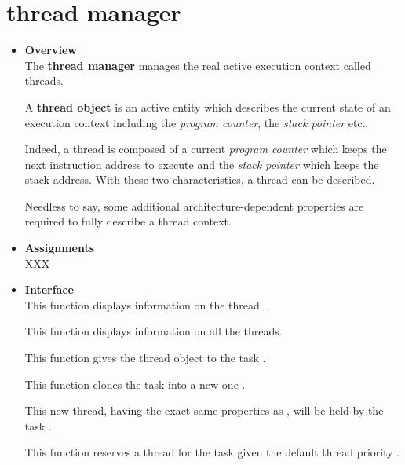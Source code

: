 \section{\textbf{thread} manager}
\begin{itemize}
  \item {\bf Overview}\\

    The \textbf{thread manager} manages the real active execution
    context called threads.

    A \textbf{thread object} is an active entity which describes the
    current state of an execution context including the
    \textit{program counter}, the \textit{stack pointer} etc..

    Indeed, a thread is composed of a current \textit{program counter}
    which keeps the next instruction address to execute and the
    \textit{stack pointer} which keeps the stack address. With these
    two characteristics, a thread can be described.

    Needless to say, some additional architecture-dependent properties
    are required to fully describe a thread context.

  \item {\bf Assignments}\\

    XXX

  \item {\bf Interface}\\

	 {
	   This function displays information on the thread .
	 }

	 {
	   This function displays information on all the threads.
	 }

	 {
	   This function gives the thread object  to the
	   task .
	 }

	 {
	   This function clones the task  into a new one
	   .

	   This new thread, having the exact same properties as ,
	   will be held by the task .
	 }

	 {
	   This function reserves a thread for the task 
	   given the default thread priority .

}
\end{itemize}
